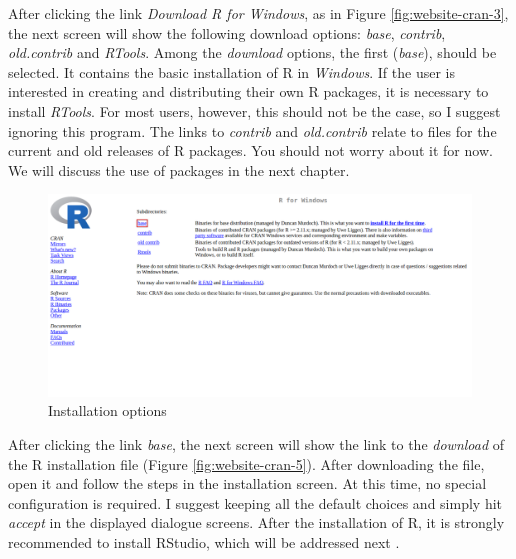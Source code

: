 \documentclass[11pt,]{book}
\begin{document}
After clicking the link \emph{Download R for Windows}, as in Figure
\ref{fig:website-cran-3}, the next screen will show the following
download options: \emph{base}, \emph{contrib}, \emph{old.contrib} and
\emph{RTools}. Among the \emph{download} options, the first
(\emph{base}), should be selected. It contains the basic installation of
R in \emph{Windows}. If the user is interested in creating and
distributing their own R packages, it is necessary to install
\emph{RTools}. For most users, however, this should not be the case, so
I suggest ignoring this program. The links to \emph{contrib} and
\emph{old.contrib} relate to files for the current and old releases of R
packages. You should not worry about it for now. We will discuss the use
of packages in the next chapter.

\begin{figure}[!htbp]

{\centering \includegraphics[width=1\linewidth]{figs/website_cran_4} 

}

\caption{Installation options}\label{fig:website-cran-4}
\end{figure}

After clicking the link \emph{base}, the next screen will show the link
to the \emph{download} of the R installation file (Figure
\ref{fig:website-cran-5}). After downloading the file, open it and
follow the steps in the installation screen. At this time, no special
configuration is required. I suggest keeping all the default choices and
simply hit \emph{accept} in the displayed dialogue screens. After the
installation of R, it is strongly recommended to install RStudio, which
will be addressed next .
\end{document}
